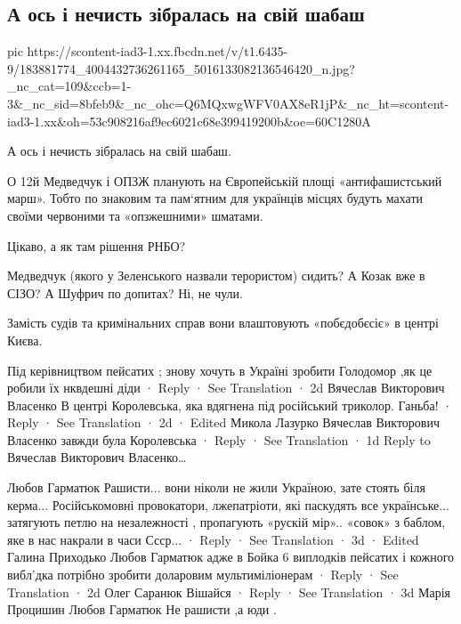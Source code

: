  
 
 
 
 

\subsection{А ось і нечисть зібралась на свій шабаш}
\label{sec:09_05_2021.fb.smolij_andrej.1.den_pobedy_opzzh}


\ifcmt
  pic https://scontent-iad3-1.xx.fbcdn.net/v/t1.6435-9/183881774_4004432736261165_5016133082136546420_n.jpg?_nc_cat=109&ccb=1-3&_nc_sid=8bfeb9&_nc_ohc=Q6MQxwgWFV0AX8eR1jP&_nc_ht=scontent-iad3-1.xx&oh=53c908216af9ec6021c68e399419200b&oe=60C1280A
\fi


А ось і нечисть зібралась на свій шабаш. 

О 12й Медведчук і ОПЗЖ планують на Європейській площі «антифашистський марш».
Тобто по знаковим та пам‘ятним для українців місцях будуть махати своїми
червоними та «опзжешними» шматами.

Цікаво, а як там рішення РНБО? 

Медведчук (якого у Зеленського назвали терористом) сидить? А Козак вже в СІЗО?
А Шуфрич по допитах? Ні, не чули. 

Замість судів та кримінальних справ вони влаштовують «побєдобєсіє» в центрі Києва.

Під керівництвом пейсатих ; знову хочуть в Україні зробити Голодомор ,як це робили їх нквдешні діди
 · Reply · See Translation · 2d
Вячеслав Викторович Власенко
В центрі Королевська, яка вдягнена під російський триколор. Ганьба!
 · Reply · See Translation · 2d · Edited
Микола Лазурко
Вячеслав Викторович Власенко завжди була Королевська
 · Reply · See Translation · 1d
Reply to Вячеслав Викторович Власенко…

Любов Гарматюк
Рашисти... вони ніколи не жили Україною, зате стоять біля керма...
Російськомовні провокатори, лжепатріоти, які паскудять все українське... затягують петлю на незалежності , пропагують «рускій мір».. «совок» з баблом, яке в нас накрали в часи Ссср...
 · Reply · See Translation · 3d · Edited
Галина Приходько
Любов Гарматюк адже в Бойка 6 виплодків пейсатих і кожного вибл'дка потрібно зробити доларовим мультиміліонерам
 · Reply · See Translation · 2d
Олег Саранюк
Вішайся
 · Reply · See Translation · 3d
Марія Процишин
Любов Гарматюк Не рашисти ,а юди .

